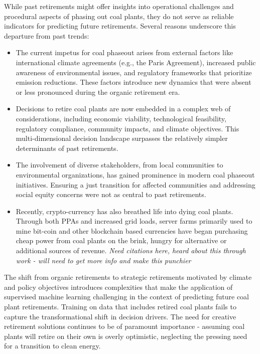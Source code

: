 \documentclass{article}
\begin{document}
While past retirements might offer insights into operational challenges and procedural aspects of phasing out coal plants, they do not serve as reliable indicators for predicting future retirements. Several reasons underscore this departure from past trends:

\begin{itemize}
    \item The current impetus for coal phaseout arises from external factors like international climate agreements (e.g., the Paris Agreement), increased public awareness of environmental issues, and regulatory frameworks that prioritize emission reductions. These factors introduce new dynamics that were absent or less pronounced during the organic retirement era.
    \item Decisions to retire coal plants are now embedded in a complex web of considerations, including economic viability, technological feasibility, regulatory compliance, community impacts, and climate objectives. This multi-dimensional decision landscape surpasses the relatively simpler determinants of past retirements.
    \item The involvement of diverse stakeholders, from local communities to environmental organizations, has gained prominence in modern coal phaseout initiatives. Ensuring a just transition for affected communities and addressing social equity concerns were not as central to past retirements.
    \item Recently, crypto-currency has also breathed life into dying coal plants. Through both PPAs and increased grid loads, server farms primarily used to mine bit-coin and other blockchain based currencies have began purchasing cheap power from coal plants on the brink, hungry for alternative or additional sources of revenue. \textit{Need citations here, heard about this through work - will need to get more info and make this punchier}
\end{itemize}

The shift from organic retirements to strategic retirements motivated by climate and policy objectives introduces complexities that make the application of supervised machine learning challenging in the context of predicting future coal plant retirements. Training on data that includes retired coal plants fails to capture the transformational shift in decision drivers. The need for creative retirement solutions continues to be of paramount importance - assuming coal plants will retire on their own is overly optimistic, neglecting the pressing need for a transition to clean energy.\\
\end{document}
